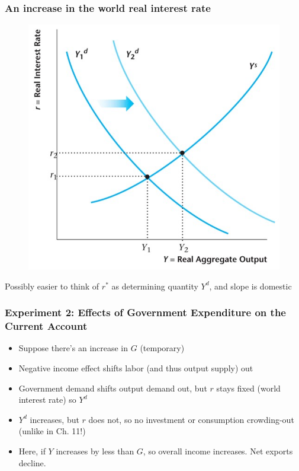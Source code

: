 \documentclass{beamer}
\begin{document}
\begin{frame}
\frametitle[alignment=center]{An increase in the world real interest rate}
\begin{figure}
\centering
\includegraphics[scale=0.55]{Figures/W_Fig_16pt8.png}
\end{figure}
Possibly easier to think of $r^*$ as determining quantity $Y^d$, and slope is domestic
\end{frame}

\begin{frame}
\frametitle[alignment=center]{Experiment 2: Effects of Government Expenditure on the Current Account}
\begin{itemize}
\item Suppose there's an increase in $G$ (temporary)
\bigskip
\item Negative income effect shifts labor (and thus output supply) out
\bigskip
\item Government demand shifts output demand out, but $r$ stays fixed (world interest rate) so $Y^d$  
\bigskip
\item $Y^d$ increases, but $r$ does not, so no investment or consumption crowding-out  (unlike in Ch. 11!)
\bigskip
\item Here, if $Y$ increases by less than $G$, so overall income increases.  Net exports decline.
\end{itemize}
\end{frame}
\end{document}
